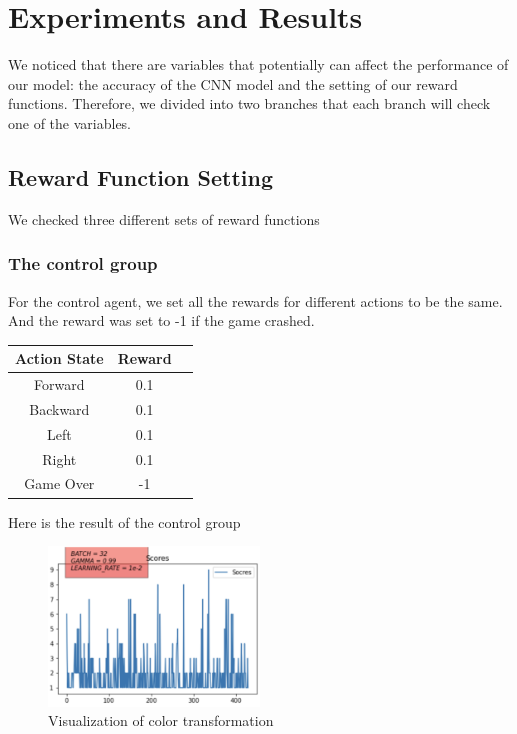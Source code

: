 \documentclass{article}
\begin{document}
\section{Experiments and Results}
We noticed that there are variables that potentially can affect the performance of our model: the accuracy of the CNN model and the setting of our reward functions. Therefore, we divided into two branches that each branch will check one of the variables. 

\subsection{Reward Function Setting}
We checked three different sets of reward functions

\subsubsection{The control group}
For the control agent, we set all the rewards for different actions to be the same. And the reward was set to -1 if the game crashed.

\begin{center}
    \begin{tabular}{ | c | c| c | } 
    \hline
    Action State & Reward\\ 
    \hline
    Forward & 0.1\\ 
    \hline
    Backward & 0.1\\ 
    \hline
    Left & 0.1\\ 
    \hline
    Right & 0.1\\ 
    \hline
    Game Over & -1\\ 
    \hline
    \end{tabular}
\end{center}

Here is the result of the control group
\begin{figure}[h]
\caption{Visualization of color transformation}
\centering
\includegraphics[width=0.5\textwidth]{ControlAgent.png}
\end{figure}
\end{document}

